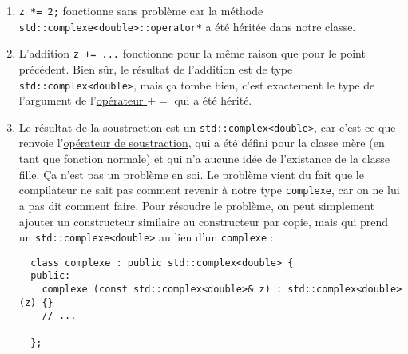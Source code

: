 \documentclass{book}
\newcommand{\inline}[1]{\texttt{#1}}
\begin{document}
\begin{correction}
\begin{enumerate}
  \item \inline{z *= 2;} fonctionne sans problème car la méthode \inline{std::complexe<double>::operator*} a été héritée dans notre classe.

  \item L'addition \inline{z += ...} fonctionne pour la même raison que pour le point précédent. Bien sûr, le résultat de l'addition est de type \inline{std::complex<double>}, mais ça tombe bien, c'est exactement le type de l'argument de l'\href{https://en.cppreference.com/w/cpp/numeric/complex/operator_arith}{opérateur $+=$} qui a été hérité.

  \item Le résultat de la soustraction est un \inline{std::complex<double>}, car c'est ce que renvoie l'\href{https://en.cppreference.com/w/cpp/numeric/complex/operator_arith2}{opérateur de soustraction}, qui a été défini pour la classe mère (en tant que fonction normale) et qui n'a aucune idée de l'existance de la classe fille. Ça n'est pas un problème en soi. Le problème vient du fait que le compilateur ne sait pas comment revenir à notre type \inline{complexe}, car on ne lui a pas dit comment faire. Pour résoudre le problème, on peut simplement ajouter un constructeur similaire au constructeur par copie, mais qui prend un \inline{std::complexe<double>} au lieu d'un \inline{complexe} :
  \begin{verbatim}
  class complexe : public std::complex<double> {
  public:
    complexe (const std::complex<double>& z) : std::complex<double>(z) {}
    // ...

  };
  \end{verbatim}

\end{enumerate}

\end{correction}
\end{document}
